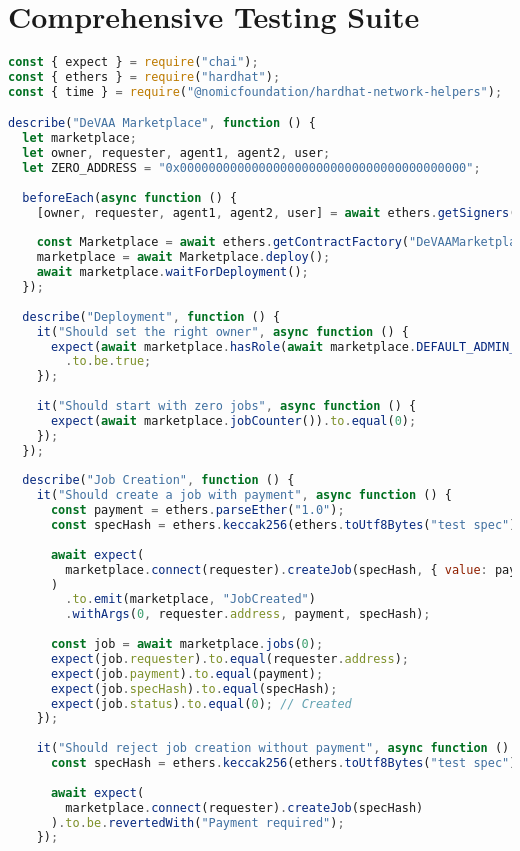 \section{Comprehensive Testing Suite}
\begin{lstlisting}[language=JavaScript,caption={Complete test suite for smart contracts}]
const { expect } = require("chai");
const { ethers } = require("hardhat");
const { time } = require("@nomicfoundation/hardhat-network-helpers");

describe("DeVAA Marketplace", function () {
  let marketplace;
  let owner, requester, agent1, agent2, user;
  let ZERO_ADDRESS = "0x0000000000000000000000000000000000000000";
  
  beforeEach(async function () {
    [owner, requester, agent1, agent2, user] = await ethers.getSigners();
    
    const Marketplace = await ethers.getContractFactory("DeVAAMarketplace");
    marketplace = await Marketplace.deploy();
    await marketplace.waitForDeployment();
  });
  
  describe("Deployment", function () {
    it("Should set the right owner", async function () {
      expect(await marketplace.hasRole(await marketplace.DEFAULT_ADMIN_ROLE(), owner.address))
        .to.be.true;
    });
    
    it("Should start with zero jobs", async function () {
      expect(await marketplace.jobCounter()).to.equal(0);
    });
  });
  
  describe("Job Creation", function () {
    it("Should create a job with payment", async function () {
      const payment = ethers.parseEther("1.0");
      const specHash = ethers.keccak256(ethers.toUtf8Bytes("test spec"));
      
      await expect(
        marketplace.connect(requester).createJob(specHash, { value: payment })
      )
        .to.emit(marketplace, "JobCreated")
        .withArgs(0, requester.address, payment, specHash);
      
      const job = await marketplace.jobs(0);
      expect(job.requester).to.equal(requester.address);
      expect(job.payment).to.equal(payment);
      expect(job.specHash).to.equal(specHash);
      expect(job.status).to.equal(0); // Created
    });
    
    it("Should reject job creation without payment", async function () {
      const specHash = ethers.keccak256(ethers.toUtf8Bytes("test spec"));
      
      await expect(
        marketplace.connect(requester).createJob(specHash)
      ).to.be.revertedWith("Payment required");
    });
    

\end{lstlisting}
